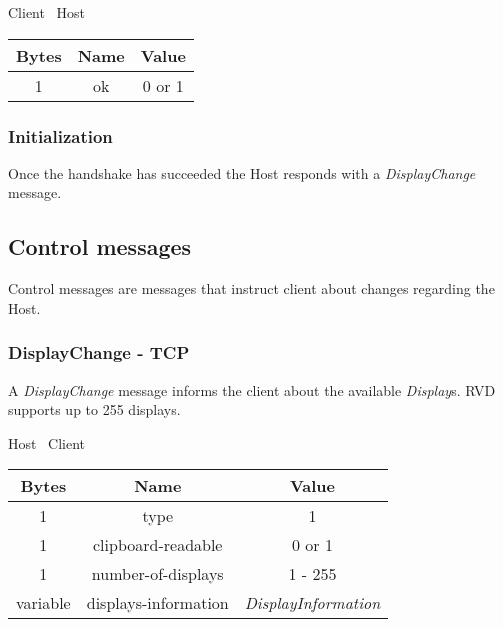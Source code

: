 \documentclass{article}
\begin{document}
    \begin{center}
        Client \textrightarrow\ Host\\
        \begin{tabular}{|c|c|c|}
            \hline
            \textbf{Bytes} & \textbf{Name} & \textbf{Value} \\
            \hline
            1              & ok            & 0 or 1         \\
            \hline
        \end{tabular}
    \end{center}

    \subsubsection{Initialization}

    Once the handshake has succeeded the Host responds with a \emph{DisplayChange} message.

    \subsection{Control messages}
    Control messages are messages that instruct client about changes regarding the Host.

    \subsubsection{DisplayChange - TCP}
    A \emph{DisplayChange} message informs the client about the available \emph{Display}s. RVD supports up to 255
    displays.

    \begin{center}
        Host \textrightarrow\ Client\\
        \begin{tabular}{|c|c|c|}
            \hline
            \textbf{Bytes} & \textbf{Name}        & \textbf{Value}            \\
            \hline
            1              & type                 & 1                         \\
            \hline
            1              & clipboard-readable   & 0 or 1                    \\
            \hline
            1              & number-of-displays   & 1 - 255                   \\
            \hline
            variable       & displays-information & \emph{DisplayInformation} \\
            \hline
        \end{tabular}
    \end{center}
\end{document}
